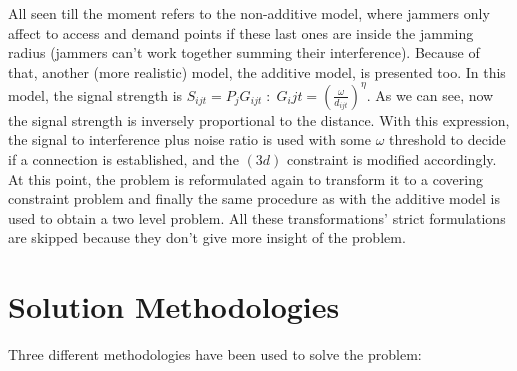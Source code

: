 \documentclass[runningheads]{llncs}
\begin{document}
All seen till the moment refers to the non-additive model, where jammers only affect to access and demand points if these last ones are inside the jamming radius (jammers can't work together summing their interference). Because of that, another (more realistic) model, the additive model, is presented too. In this model, the signal strength is $S_{ijt}=P_j G_{ijt} \; : \; G_ijt=(\frac{\omega}{d_{ijt}})^\eta$. As we can see, now the signal strength is inversely proportional to the distance. With this expression, the signal to interference plus noise ratio is used with some $\omega$ threshold to decide if a connection is established, and the $(3d)$ constraint is modified accordingly. At this point, the problem is reformulated again to transform it to a covering constraint problem and finally the same procedure as with the additive model is used to obtain a two level problem. All these transformations' strict formulations are skipped because they don't give more insight of the problem.


\section{Solution Methodologies}

Three different methodologies have been used to solve the problem:
\end{document}
